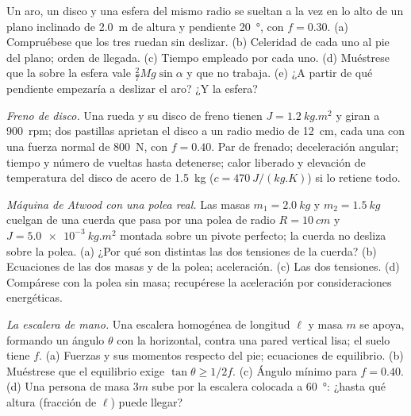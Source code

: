 \begin{exercise}[$\star\star$]\label{exo:b2:rigid-body-mechanics:5}
Un aro, un disco y una esfera del mismo radio se sueltan a la vez en lo
alto de un plano inclinado de \qty{2.0}{m} de altura y pendiente
\qty{20}{\degree}, con $f =
0.30$. (a) Compruébese que los tres ruedan sin deslizar. (b) Celeridad de
cada uno al pie del plano; orden de llegada. (c) Tiempo empleado por cada
uno. (d) Muéstrese que la  sobre la esfera vale
$\tfrac27Mg\sin\alpha$ y que no trabaja. (e) ¿A partir de qué pendiente
empezaría a deslizar el aro? ¿Y la esfera?
\end{exercise}

\begin{exercise}[$\star\star$]\label{exo:b2:rigid-body-mechanics:6}
\emph{Freno de disco.} Una rueda y su disco de freno tienen $J = \qty{1.2}{kg.m^2}$
y giran a \qty{900}{rpm}; dos pastillas aprietan el disco a un radio medio
de \qty{12}{cm}, cada una con una fuerza normal de \qty{800}{N}, con
$f = 0.40$. Par de frenado; deceleración angular; tiempo y número de
vueltas hasta detenerse; calor liberado y elevación de temperatura del
disco de acero de \qty{1.5}{kg} ($c = \qty{470}{J/(kg.K)}$) si lo retiene todo.
\end{exercise}

\begin{exercise}[$\star\star$]\label{exo:b2:rigid-body-mechanics:7}
\emph{Máquina de Atwood con una polea real.} Las masas $m_1 = \qty{2.0}{kg}$
y $m_2 = \qty{1.5}{kg}$ cuelgan de una cuerda que pasa por una polea de radio $R =
\qty{10}{cm}$ y  $J = \qty{5.0e-3}{kg.m^2}$ montada sobre
un pivote perfecto; la cuerda no desliza sobre la polea. (a) ¿Por qué son
distintas las dos tensiones de la cuerda? (b) Ecuaciones de las dos masas
y de la polea; aceleración. (c) Las dos tensiones. (d) Compárese con la
polea sin masa; recupérese la aceleración por consideraciones energéticas.
\end{exercise}

\begin{exercise}[$\star\star$]\label{exo:b2:rigid-body-mechanics:8}
\emph{La escalera de mano.} Una escalera homogénea de longitud $\ell$ y
masa $m$ se apoya, formando un ángulo $\theta$ con la horizontal, contra
una pared vertical lisa; el suelo tiene  $f$.
(a) Fuerzas y sus momentos respecto del pie; ecuaciones de equilibrio.
(b) Muéstrese que el equilibrio exige $\tan\theta \ge 1/2f$. (c) Ángulo
mínimo para $f = 0.40$. (d) Una persona de masa $3m$ sube por la escalera
colocada a \qty{60}{\degree}: ¿hasta qué altura (fracción de $\ell$) puede llegar?
\end{exercise}


